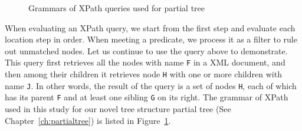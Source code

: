\begin{figure}[!t]
	\centering{}
	\caption{Grammars of XPath queries used for partial tree}
	\label{fig:grammar}
\end{figure}


When evaluating an XPath query, we start from the first step and evaluate each
location step in order. When meeting a predicate, we process it as a filter to
rule out unmatched nodes. Let us continue to use the query above to demonstrate.
This query first retrieves all the nodes with name \verb|F| in a XML document,
and then among their children it retrieves node \verb|H| with one or more
children with name \verb|J|. In other words, the result of the query is a set of
nodes \verb|H|, each of which has its parent \verb|F| and at least one sibling
\verb|G| on its right. The grammar of XPath used in this study for our novel
tree structure partial tree (See Chapter~\ref{ch:partialtree}) is listed in
Figure~\ref{fig:grammar}.


